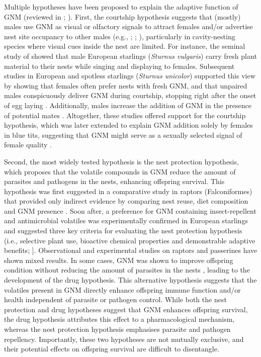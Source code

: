 \documentclass[
  number,
  review,
  onecolumn]{elsarticle}
\begin{document}
Multiple hypotheses have been proposed to explain the adaptive function
of GNM (reviewed in \citep{dubiec2013}; \citep{scott-baumann2015}).
First, the courtship hypothesis suggests that (mostly) males use GNM as
visual or olfactory signals to attract females and/or advertise nest
site occupancy to other males (e.g., \citep{eens1993};
\citep{gwinner1997}; \citep{brouwer2004}), particularly in
cavity-nesting species where visual cues inside the nest are limited.
For instance, the seminal study of \citep{kessel1957} showed that male
European starlings (\emph{Sturnus vulgaris}) carry fresh plant material
to their nests while singing and displaying to females. Subsequent
studies in European and spotless starlings (\emph{Sturnus unicolor})
supported this view by showing that females often prefer nests with
fresh GNM, and that unpaired males conspicuously deliver GNM during
courtship, stopping right after the onset of egg laying
\citep{brouwer2004, veiga2006}. Additionally, males increase the
addition of GNM in the presence of potential mates \citep{eens1993}.
Altogether, these studies offered support for the courtship hypothesis,
which was later extended to explain GNM addition solely by females in
blue tits, suggesting that GNM might serve as a sexually selected signal
of female quality \citep{tomás2013}.

Second, the most widely tested hypothesis is the nest protection
hypothesis, which proposes that the volatile compounds in GNM reduce the
amount of parasites and pathogens in the nests, enhancing offspring
survival. This hypothesis was first suggested in a comparative study in
raptors (Falconiformes) that provided only indirect evidence by
comparing nest reuse, diet composition and GNM presence
\citep{wimberger1984}. Soon after, a preference for GNM containing
insect-repellent and antimicrobial volatiles was experimentally
confirmed in European starlings and suggested three key criteria for
evaluating the nest protection hypothesis (i.e., selective plant use,
bioactive chemical properties and demonstrable adaptive benefits;
\citep{clark1985}{]}. Observational and experimental studies on raptors
\citep{ontiveros2007, dykstra2009} and passerines
\citep{lafuma2001, dawson2004, mennerat2009b, quiroga2012} have shown
mixed results. In some cases, GNM was shown to improve offspring
condition without reducing the amount of parasites in the nests
\citep{gwinner2000}, leading to the development of the drug hypothesis.
This alternative hypothesis suggests that the volatiles present in GNM
directly enhance offspring immune function and/or health independent of
parasite or pathogen control\citep{gwinner2000, mennerat2009a}. While
both the nest protection and drug hypotheses suggest that GNM enhances
offspring survival, the drug hypothesis attributes this effect to a
pharmacological mechanism, whereas the nest protection hypothesis
emphasises parasite and pathogen repellency. Importantly, these two
hypotheses are not mutually exclusive, and their potential effects on
offspring survival are difficult to disentangle.
\end{document}
